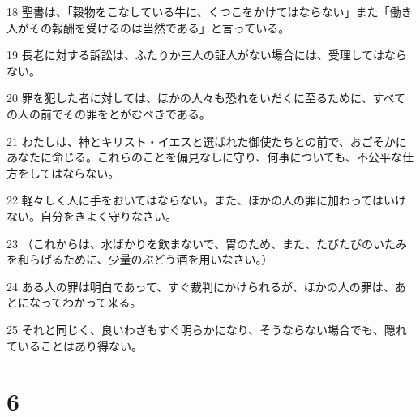 \par 18 聖書は、「穀物をこなしている牛に、くつこをかけてはならない」また「働き人がその報酬を受けるのは当然である」と言っている。
\par 19 長老に対する訴訟は、ふたりか三人の証人がない場合には、受理してはならない。
\par 20 罪を犯した者に対しては、ほかの人々も恐れをいだくに至るために、すべての人の前でその罪をとがむべきである。
\par 21 わたしは、神とキリスト・イエスと選ばれた御使たちとの前で、おごそかにあなたに命じる。これらのことを偏見なしに守り、何事についても、不公平な仕方をしてはならない。
\par 22 軽々しく人に手をおいてはならない。また、ほかの人の罪に加わってはいけない。自分をきよく守りなさい。
\par 23 （これからは、水ばかりを飲まないで、胃のため、また、たびたびのいたみを和らげるために、少量のぶどう酒を用いなさい。）
\par 24 ある人の罪は明白であって、すぐ裁判にかけられるが、ほかの人の罪は、あとになってわかって来る。
\par 25 それと同じく、良いわざもすぐ明らかになり、そうならない場合でも、隠れていることはあり得ない。

\chapter{6}

